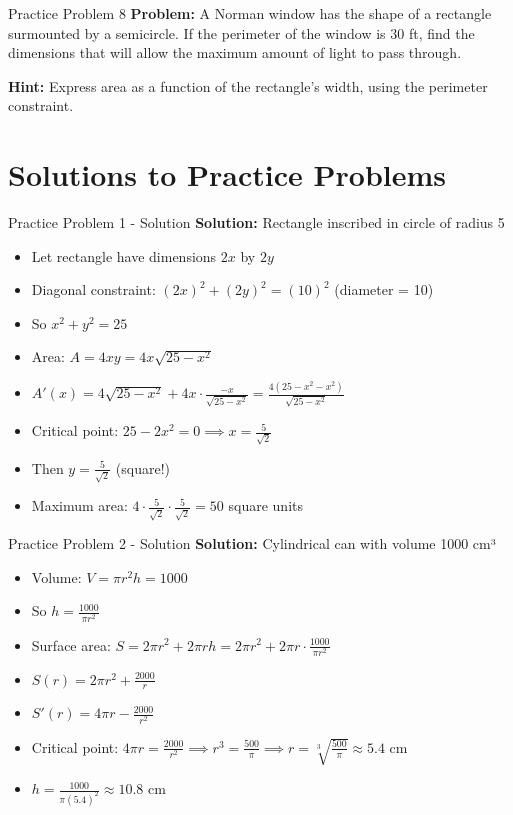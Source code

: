 \documentclass[aspectratio=169]{beamer}
\begin{document}
\begin{frame}{Practice Problem 8}
\textbf{Problem:} A Norman window has the shape of a rectangle surmounted by a semicircle. If the perimeter of the window is 30 ft, find the dimensions that will allow the maximum amount of light to pass through.

\textbf{Hint:} Express area as a function of the rectangle's width, using the perimeter constraint.
\end{frame}

\section{Solutions to Practice Problems}

\begin{frame}{Practice Problem 1 - Solution}
\textbf{Solution:} Rectangle inscribed in circle of radius 5

\begin{itemize}
    \item Let rectangle have dimensions $2x$ by $2y$
    \item Diagonal constraint: $(2x)^2 + (2y)^2 = (10)^2$ (diameter = 10)
    \item So $x^2 + y^2 = 25$
    \item Area: $A = 4xy = 4x\sqrt{25-x^2}$
    \item $A'(x) = 4\sqrt{25-x^2} + 4x \cdot \frac{-x}{\sqrt{25-x^2}} = \frac{4(25-x^2-x^2)}{\sqrt{25-x^2}}$
    \item Critical point: $25-2x^2 = 0 \implies x = \frac{5}{\sqrt{2}}$
    \item Then $y = \frac{5}{\sqrt{2}}$ (square!)
    \item Maximum area: $4 \cdot \frac{5}{\sqrt{2}} \cdot \frac{5}{\sqrt{2}} = 50$ square units
\end{itemize}
\end{frame}

\begin{frame}{Practice Problem 2 - Solution}
\textbf{Solution:} Cylindrical can with volume 1000 cm³

\begin{itemize}
    \item Volume: $V = \pi r^2 h = 1000$
    \item So $h = \frac{1000}{\pi r^2}$
    \item Surface area: $S = 2\pi r^2 + 2\pi rh = 2\pi r^2 + 2\pi r \cdot \frac{1000}{\pi r^2}$
    \item $S(r) = 2\pi r^2 + \frac{2000}{r}$
    \item $S'(r) = 4\pi r - \frac{2000}{r^2}$
    \item Critical point: $4\pi r = \frac{2000}{r^2} \implies r^3 = \frac{500}{\pi} \implies r = \sqrt[3]{\frac{500}{\pi}} \approx 5.4$ cm
    \item $h = \frac{1000}{\pi (5.4)^2} \approx 10.8$ cm
\end{itemize}
\end{frame}
\end{document}
